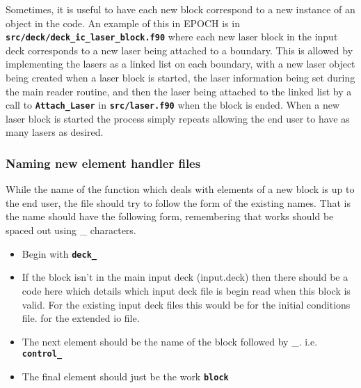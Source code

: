 \documentclass[12pt]{article}
\newcommand{\inlinecode}[1]{{\color{warwickred} \bf\texttt{#1}}}
\newcommand{\nEPOCH}{{\color{warwickdark}\fontfamily{phv}\selectfont EPOCH}}
\newcommand{\EPOCH}{{\nEPOCH} }
\begin{document}
Sometimes, it is useful to have each new block correspond to a new instance of
an object in the code. An example of this in \EPOCH is in
\inlinecode{src/deck/deck\_ic\_laser\_block.f90} where each new laser block in
the input deck corresponds to a new laser being attached to a boundary. This is
allowed by implementing the lasers as a linked list on each boundary, with a
new laser object being created when a laser block is started, the laser
information being set during the main reader routine, and then the laser being
attached to the linked list by a call to \inlinecode{Attach\_Laser} in
\inlinecode{src/laser.f90} when the block is ended. When a new laser block is
started the process simply repeats allowing the end user to have as many lasers
as desired.

\subsubsection{Naming new element handler files}
While the name of the function which deals with elements of a new block is up
to the end user, the file should try to follow the form of the existing
names. That is the name should have the following form, remembering that works
should be spaced out using \_ characters.
\begin{itemize}
\item Begin with \inlinecode{deck\_}
\item If the block isn't in the main input deck (input.deck) then there
  should be a code here which details which input deck file is begin read
  when this block is valid. For the existing input deck files this would be
  \subitem \inlinecode{IC\_} for the initial conditions file.
  \subitem \inlinecode{EIO\_} for the extended io file.
\item The next element should be the name of the block followed by \_.
  i.e. \inlinecode{control\_}
\item The final element should just be the work \inlinecode{block}
\end{itemize}
\end{document}
